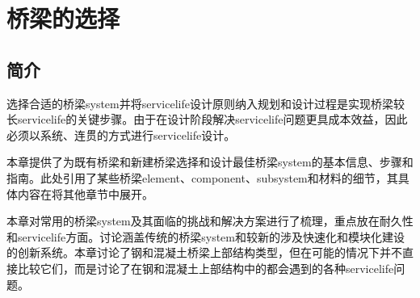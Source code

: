 \chapter{桥梁的选择}\label{chp:bridge-system-selection}
\section{简介}
选择合适的桥梁\gls*{system}并将\gls*{servicelife}设计原则纳入规划和设计过程是实现桥梁较长\gls*{servicelife}的关键步骤。由于在设计阶段解决\gls*{servicelife}问题更具成本效益，因此必须以系统、连贯的方式进行\gls*{servicelife}设计。

本章提供了为既有桥梁和新建桥梁选择和设计最佳桥梁\gls*{system}的基本信息、步骤和指南。此处引用了某些桥梁\gls*{element}、\gls*{component}、\gls*{subsystem}和材料的细节，其具体内容在将其他章节中展开。

本章对常用的桥梁\gls*{system}及其面临的挑战和解决方案进行了梳理，重点放在耐久性和\gls*{servicelife}方面。讨论涵盖传统的桥梁\gls*{system}和较新的涉及快速化和模块化建设的创新系统。本章讨论了钢和混凝土桥梁上部结构类型，但在可能的情况下并不直接比较它们，而是讨论了在钢和混凝土上部结构中的都会遇到的各种\gls*{servicelife}问题。

